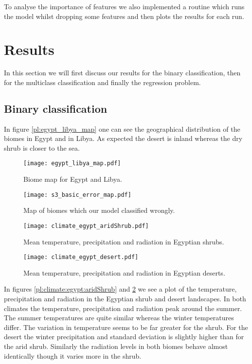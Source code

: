 To analyse the importance of features we also implemented a routine which runs the model whilst dropping some features
and then plots the results for each run.


\section{Results}

In this section we will first discuss our results for the binary classification, then for the multiclass classification
and finally the regression problem.

\subsection{Binary classification}

In figure \ref{pl:egypt_libya_map} one can see the geographical distribution of the biomes in Egypt and 
in Libya. As expected the desert is inland whereas the dry shrub is closer to the sea.
\begin{figure}[h]
  \centering
  \begin{minipage}{0.5\textwidth}
    \centering
    \texttt{[image: egypt\_libya\_map.pdf]}
    \caption{Biome map for Egypt and Libya.}
    \label{pl:egypt_libya_map}
  \end{minipage}
  \hfill
  \begin{minipage}{0.4\textwidth}
    \centering
    \texttt{[image: s3\_basic\_error\_map.pdf]}
    \caption{Map of biomes which our model classified wrongly.}
    \label{pl:s3_basic_error_map}
  \end{minipage}
\end{figure}

\begin{figure}[h]
  \centering
  \begin{minipage}{0.45\textwidth}
    \centering
    \texttt{[image: climate\_egypt\_aridShrub.pdf]}
    \caption{Mean temperature, precipitation and radiation in Egyptian shrubs.}
    \label{pl:climate:egypt:aridShrub}
  \end{minipage}
  \hfill
  \begin{minipage}{0.45\textwidth}
    \centering
    \texttt{[image: climate\_egypt\_desert.pdf]}
    \caption{Mean temperature, precipitation and radiation in Egyptian deserts.}
    \label{pl:climate:egypt:desert}
  \end{minipage}
\end{figure}
In figures \ref{pl:climate:egypt:aridShrub} and \ref{pl:climate:egypt:desert}
we see a plot of the temperature, precipitation and radiation 
in the Egyptian shrub and desert landscapes.
In both climates the temperature, precipitation and radiation peak around the summer.
The summer temperatures are quite similar whereas the winter temperatures differ. The variation in temperature
seems to be far greater for the shrub. For the desert the winter precipitation and standard deviation is slightly higher than for the
arid shrub. Similarly the radiation levels in both biomes behave almost identically though it varies more in the shrub.

